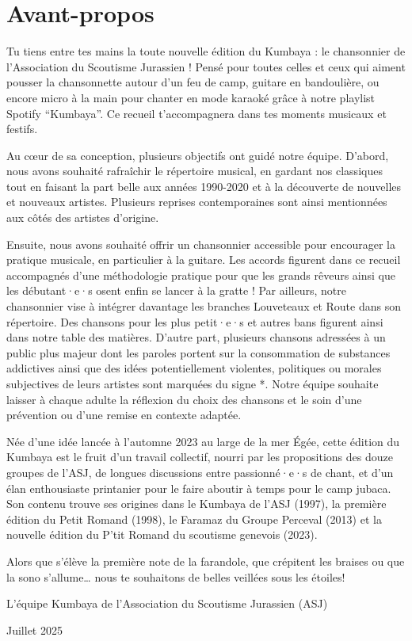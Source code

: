 \section*{Avant-propos}
\small Tu tiens entre tes mains la toute nouvelle édition du Kumbaya : le chansonnier de l'Association du Scoutisme Jurassien ! Pensé pour toutes celles et ceux qui aiment pousser la chansonnette autour d'un feu de camp, guitare en bandoulière, ou encore micro à la main pour chanter en mode karaoké grâce à notre playlist Spotify “Kumbaya”. Ce recueil t'accompagnera dans tes moments musicaux et festifs.

Au cœur de sa conception, plusieurs objectifs ont guidé notre équipe. D'abord, nous avons souhaité rafraîchir le répertoire musical, en gardant nos classiques tout en faisant la part belle aux années 1990-2020 et à la découverte de nouvelles et nouveaux artistes. Plusieurs reprises contemporaines sont ainsi mentionnées aux côtés des artistes d'origine.

Ensuite, nous avons souhaité offrir un chansonnier accessible pour encourager la pratique musicale, en particulier à la guitare. Les accords figurent dans ce recueil accompagnés d'une méthodologie pratique pour que les grands rêveurs ainsi que les débutant·e·s osent enfin se lancer à la gratte !
Par ailleurs, notre chansonnier vise à intégrer davantage les branches Louveteaux et Route dans son répertoire. Des chansons pour les plus petit·e·s et autres bans figurent ainsi dans notre table des matières. D'autre part, plusieurs chansons adressées à un public plus majeur dont les paroles portent sur la consommation de substances addictives ainsi que des idées potentiellement violentes, politiques ou morales subjectives de leurs artistes sont marquées du signe *. Notre équipe souhaite laisser à chaque adulte la réflexion du choix des chansons et le soin d'une prévention ou d'une remise en contexte adaptée.

Née d'une idée lancée à l'automne 2023 au large de la mer Égée, cette édition du Kumbaya est le fruit d'un travail collectif, nourri par les propositions des douze groupes de l'ASJ, de longues discussions entre passionné·e·s de chant, et d'un élan enthousiaste printanier pour le faire aboutir à temps pour le camp jubaca. Son contenu trouve ses origines dans le Kumbaya de l'ASJ (1997), la première édition du Petit Romand (1998), le Faramaz du Groupe Perceval (2013) et la nouvelle édition du P'tit Romand du scoutisme genevois (2023).

Alors que s'élève la première note de la farandole, que crépitent les braises ou que la sono s'allume… nous te souhaitons de belles veillées sous les étoiles!

L'équipe Kumbaya de l'Association du Scoutisme Jurassien (ASJ)

Juillet 2025
